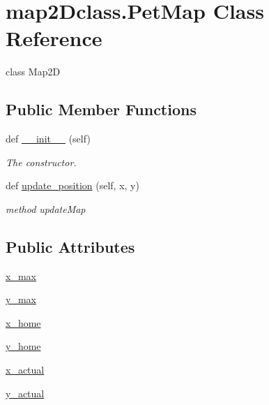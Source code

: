 \hypertarget{classmap2Dclass_1_1PetMap}{}\section{map2\+Dclass.\+Pet\+Map Class Reference}
\label{classmap2Dclass_1_1PetMap}


class Map2D  


\subsection*{Public Member Functions}
\begin{DoxyCompactItemize}
\item 
def \hyperlink{classmap2Dclass_1_1PetMap_a0e454f29f7e6318c2cebc618676136ed}{\+\_\+\+\_\+init\+\_\+\+\_\+} (self)
\begin{DoxyCompactList}\small\item\em The constructor. \end{DoxyCompactList}\item 
def \hyperlink{classmap2Dclass_1_1PetMap_a346c40eccf22651ef2978ecdb6635898}{update\+\_\+position} (self, x, y)
\begin{DoxyCompactList}\small\item\em method update\+Map \end{DoxyCompactList}\end{DoxyCompactItemize}
\subsection*{Public Attributes}
\begin{DoxyCompactItemize}
\item 
\hyperlink{classmap2Dclass_1_1PetMap_a0a948618f8974b5ebdac2c1ca24cb8cd}{x\+\_\+max}
\item 
\hyperlink{classmap2Dclass_1_1PetMap_a663585a180d6c38e4eed57900ea2ce1c}{y\+\_\+max}
\item 
\hyperlink{classmap2Dclass_1_1PetMap_a17deee053ed583b3b6ec48e7e3f631df}{x\+\_\+home}
\item 
\hyperlink{classmap2Dclass_1_1PetMap_ad52ba76f38e067e57e7b221645f50cb9}{y\+\_\+home}
\item 
\hyperlink{classmap2Dclass_1_1PetMap_a9156cd467e0b7146a0f5e14131101b88}{x\+\_\+actual}
\item 
\hyperlink{classmap2Dclass_1_1PetMap_a5f4829bd696c1737b16917dc07e3d523}{y\+\_\+actual}
\end{DoxyCompactItemize}


